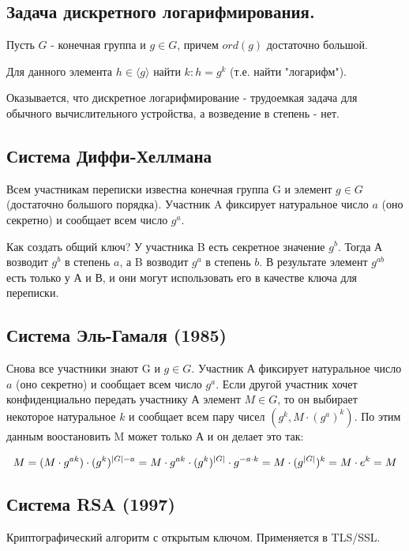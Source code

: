 \documentclass[../main.tex]{subfiles}
\begin{document}
\subsection{Задача дискретного логарифмирования.}
    Пусть $G$ - конечная группа и $g\in G$, причем $ord(g)$ достаточно большой.

     Для данного элемента $h\in \langle g\rangle$ найти $k: h = g^k$ (т.е. найти "логарифм").

    Оказывается, что дискретное логарифмирование - трудоемкая задача для обычного вычислительного устройства,
    а возведение в степень - нет.

    \subsection{Система Диффи-Хеллмана}

    Всем участникам переписки известна конечная группа G и элемент $g\in G$ (достаточно большого порядка).
    Участник A фиксирует натуральное число $a$ (оно секретно) и сообщает всем число $g^a$.

    Как создать общий ключ? У участника B есть секретное значение $g^b$. Тогда А возводит $g^b$ в
    степень $a$, а B возводит $g^a$ в степень $b$. В результате элемент $g^{ab}$ есть только у А и В,
    и они могут использовать его в качестве ключа для переписки.

    \subsection{Система Эль-Гамаля (1985)}

    Снова все участники знают G и $g\in G$. Участник А фиксирует натуральное число $a$ (оно секретно) и
    сообщает всем число $g^a$. Если другой участник хочет конфиденциально передать участнику А элемент
    $M\in G$, то он выбирает некоторое натуральное $k$ и сообщает всем пару чисел $(g^k, M\cdot(g^a)^k)$.
    По этим данным воостановить M может только А и он делает это так:

    $$ M = (M\cdot g^{ak})\cdot (g^k)^{\vert G\vert - a} = M\cdot g^{ak}\cdot (g^k)^{\vert G\vert}\cdot g^{-a\cdot k} =
    M\cdot (g^{\vert G\vert})^k = M\cdot e^k = M$$

    \subsection{Система RSA (1997)}
    Криптографический алгоритм с открытым ключом. Применяется в TLS/SSL.
\end{document}
